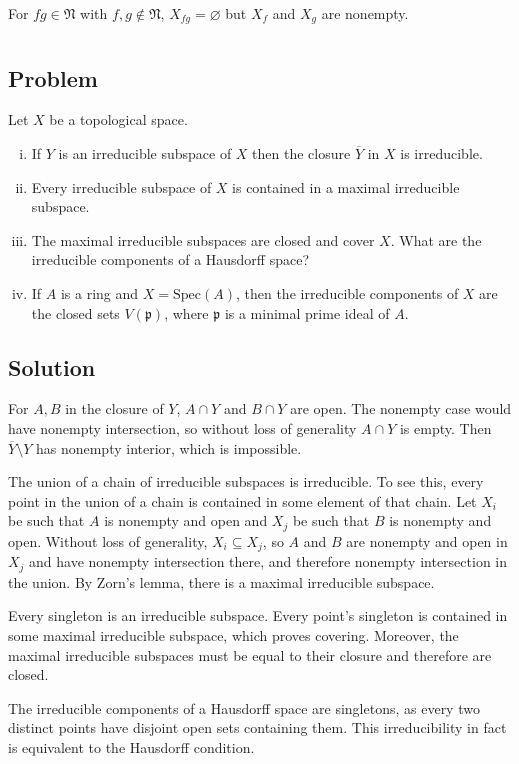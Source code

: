\documentclass[book,12pt,oneside,openany]{memoir}
\begin{document}
For $fg\in \mathfrak N$ with $f,g\notin \mathfrak N$, $X_{fg}=\varnothing$
but $X_f$ and $X_g$ are nonempty.


\section{}
\subsection{Problem}
Let $X$ be a topological space.
\begin{enumerate}[i)]
\item If $Y$ is an irreducible subspace of $X$ then the closure
$\overline{Y}$ in $X$ is irreducible.
\item Every irreducible subspace of $X$ is contained in a maximal
irreducible subspace.
\item The maximal irreducible subspaces are closed and cover $X$.
What are the irreducible components of a Hausdorff space?
\item If $A$ is a ring and $X=\text{Spec}(A)$, then the
irreducible components of $X$ are the closed sets $V(\mathfrak p)$,
where $\mathfrak p$ is a minimal prime ideal of $A$.
\end{enumerate}
\subsection{Solution}
For $A,B$ in the closure of $Y$, $A\cap Y$ and $B \cap Y$ are open.
The nonempty case would have nonempty intersection, so without
loss of generality $A\cap Y$ is empty.
Then $\overline{Y}\setminus Y$ has nonempty interior, which is impossible.

The union of a chain of irreducible subspaces is irreducible.
To see this, every point in the union of a chain is contained in some
element of that chain.
Let $X_i$ be such that $A$ is nonempty and open and
$X_j$ be such that $B$ is nonempty and open.
Without loss of generality, $X_i \subseteq X_j$, so $A$ and $B$ are nonempty
and open in $X_j$ and have nonempty intersection there, and therefore
nonempty intersection in the union.
By Zorn's lemma, there is a maximal irreducible subspace.

Every singleton is an irreducible subspace.
Every point's singleton is contained in some maximal irreducible subspace,
which proves covering.
Moreover, the maximal irreducible subspaces must be equal to their closure
and therefore are closed.

The irreducible components of a Hausdorff space are singletons, as every
two distinct points have disjoint open sets containing them.
This irreducibility in fact is equivalent to the Hausdorff condition.
\end{document}
